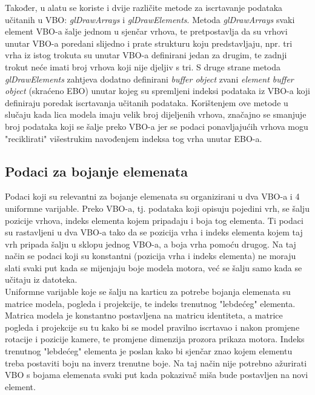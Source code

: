\documentclass[times, utf8, diplomski]{fer}
\begin{document}
Također, u alatu se koriste i dvije različite metode za iscrtavanje podataka učitanih u VBO: \textit{glDrawArrays} i \textit{glDrawElements}. Metoda \textit{glDrawArrays} svaki element VBO-a šalje jednom u sjenčar vrhova, te pretpostavlja da su vrhovi unutar VBO-a poredani slijedno i prate strukturu koju predstavljaju, npr. tri vrha iz istog trokuta su unutar VBO-a definirani jedan za drugim, te zadnji trokut neće imati broj vrhova koji nije djeljiv s tri. S druge strane metoda \textit{glDrawElements} zahtjeva dodatno definirani \textit{buffer object} zvani \textit{element buffer object} (skraćeno EBO) unutar kojeg su spremljeni indeksi podataka iz VBO-a koji definiraju poredak iscrtavanja učitanih podataka. Korištenjem ove metode u slučaju kada lica modela imaju velik broj dijeljenih vrhova, značajno se smanjuje broj podataka koji se šalje preko VBO-a jer se podaci ponavljajućih vrhova mogu "reciklirati" višestrukim navođenjem indeksa tog vrha unutar EBO-a.

\subsection{Podaci za bojanje elemenata}

Podaci koji su relevantni za bojanje elemenata su organizirani u dva VBO-a i 4 uniformne varijable. Preko VBO-a, tj. podataka koji opisuju pojedini vrh, se šalju pozicije vrhova, indeks elementa kojem pripadaju i boja tog elementa. Ti podaci su rastavljeni u dva VBO-a tako da se pozicija vrha i indeks elementa kojem taj vrh pripada šalju u sklopu jednog VBO-a, a boja vrha pomoću drugog. Na taj način se podaci koji su konstantni (pozicija vrha i indeks elementa) ne moraju slati svaki put kada se mijenjaju boje modela motora, već se šalju samo kada se učitaju iz datoteka.\\

Uniformne varijable koje se šalju na karticu za potrebe bojanja elemenata su matrice modela, pogleda i projekcije, te indeks trenutnog "lebdećeg" elementa. Matrica modela je konstantno postavljena na matricu identiteta, a matrice pogleda i projekcije su tu kako bi se model pravilno iscrtavao i nakon promjene rotacije i pozicije kamere, te promjene dimenzija prozora prikaza motora. Indeks trenutnog "lebdećeg" elementa je poslan kako bi sjenčar znao kojem elementu treba postaviti boju na inverz trenutne boje. Na taj način nije potrebno ažurirati VBO s bojama elemenata svaki put kada pokazivač miša bude postavljen na novi element.\\
\end{document}
